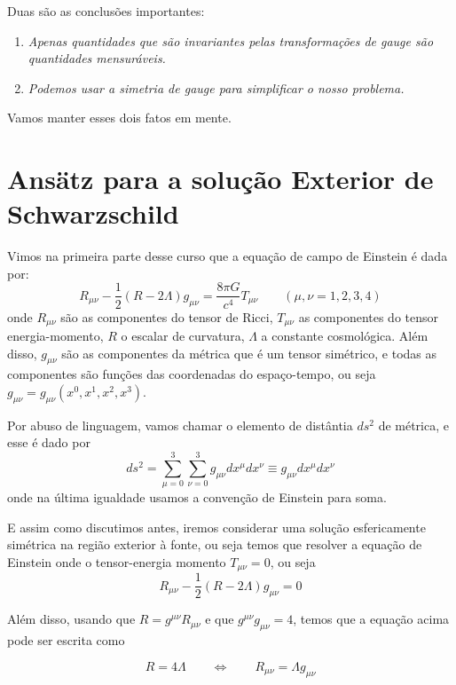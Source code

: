 \documentclass[11pt]{article}
\begin{document}
Duas são as conclusões importantes:

\begin{enumerate}
\def\labelenumi{\arabic{enumi})}
\item
  \emph{Apenas quantidades que são invariantes pelas transformações de
  gauge são quantidades mensuráveis.}
\item
  \emph{Podemos usar a simetria de gauge para simplificar o nosso
  problema.}
\end{enumerate}

Vamos manter esses dois fatos em mente.

    \hypertarget{ansuxe4tz-para-a-soluuxe7uxe3o-exterior-de-schwarzschild}{%
\section{Ansätz para a solução Exterior de
Schwarzschild}\label{ansuxe4tz-para-a-soluuxe7uxe3o-exterior-de-schwarzschild}}

    Vimos na primeira parte desse curso que a equação de campo de Einstein é
dada por:
\[ \tag{3.1} R_{\mu\nu} - \frac{1}{2} (R - 2 \Lambda) g_{\mu\nu} = \frac{8 \pi G}{c^4} T_{\mu\nu} \qquad (\mu, \nu = 1,2,3,4)\]
onde \(R_{\mu\nu}\) são as componentes do tensor de Ricci,
\(T_{\mu\nu}\) as componentes do tensor energia-momento, \(R\) o escalar
de curvatura, \(\Lambda\) a constante cosmológica. Além disso,
\(g_{\mu\nu}\) são as componentes da métrica que é um tensor simétrico,
e todas as componentes são funções das coordenadas do espaço-tempo, ou
seja \(g_{\mu\nu}=g_{\mu\nu}(x^0, x^1, x^2, x^3)\).

Por abuso de linguagem, vamos chamar o elemento de distântia \(ds^2\) de
métrica, e esse é dado por
\[ \tag{3.2} ds^2 = \sum_{\mu=0}^3 \sum_{\nu=0}^3 g_{\mu\nu} dx^\mu dx^\nu  \equiv  g_{\mu\nu} dx^\mu dx^\nu \]
onde na última igualdade usamos a convenção de Einstein para soma.

E assim como discutimos antes, iremos considerar uma solução
esfericamente simétrica na região exterior à fonte, ou seja temos que
resolver a equação de Einstein onde o tensor-energia momento
\(T_{\mu\nu} = 0\), ou seja
\[ \tag{3.3.a} R_{\mu\nu} - \frac{1}{2} (R - 2 \Lambda) g_{\mu\nu} = 0 \]

Além disso, usando que \(R = g^{\mu\nu} R_{\mu\nu}\) e que
\(g^{\mu\nu} g_{\mu\nu} = 4\), temos que a equação acima pode ser
escrita como

\[ \tag{3.3.b} R = 4\Lambda
\qquad \Leftrightarrow \qquad R_{\mu\nu} = \Lambda g_{\mu\nu}\]
\end{document}
